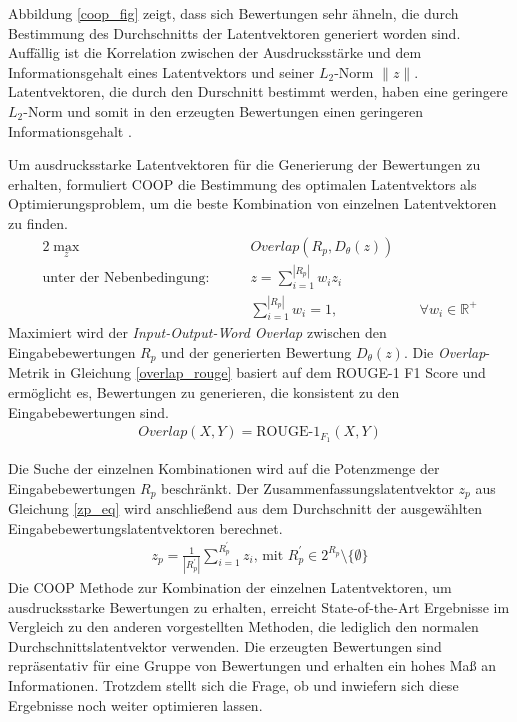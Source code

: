 Abbildung \ref{coop_fig} zeigt, dass sich Bewertungen sehr ähneln, die durch Bestimmung des Durchschnitts der Latentvektoren generiert worden sind. 
Auffällig ist die Korrelation zwischen der Ausdrucksstärke und dem Informationsgehalt eines Latentvektors und seiner $L_2$-Norm $\| z \|$.
Latentvektoren, die durch den Durschnitt bestimmt werden, haben eine geringere $L_2$-Norm und somit in den erzeugten Bewertungen einen geringeren Informationsgehalt \citep{coop}.

Um ausdrucksstarke Latentvektoren für die Generierung der Bewertungen zu erhalten, formuliert COOP \citep{coop} die Bestimmung des optimalen Latentvektors als Optimierungsproblem, um die beste Kombination von einzelnen Latentvektoren zu finden.
\begin{alignat*}{2}
    \max_z              &\quad&  Overlap(R_p, D_\theta(z))    & \\
    \text{unter der Nebenbedingung: } &\quad&  z = \sum_{i=1}^{|R_p|} w_i z_i \\
                         &\quad&  \sum_{i=1}^{|R_p|}w_i=1,                        &\quad \forall w_i \in \mathbb{R}^+
\end{alignat*}
Maximiert wird der \textit{Input-Output-Word Overlap} zwischen den Eingabebewertungen $R_p$ und der generierten Bewertung $D_\theta(z)$. 
Die \textit{Overlap}-Metrik in Gleichung \ref{overlap_rouge} basiert auf dem ROUGE-1 F1 Score und ermöglicht es, Bewertungen zu generieren, die konsistent zu den Eingabebewertungen sind.
\begin{align}
    \label{overlap_rouge}
    Overlap(X,Y) = \text{ROUGE-1}_{F_1}(X,Y)
\end{align}

Die Suche der einzelnen Kombinationen wird auf die Potenzmenge der Eingabebewertungen $R_p$ beschränkt. 
Der Zusammenfassungslatentvektor $z_p$ aus Gleichung \ref{zp_eq} wird anschließend aus dem Durchschnitt der ausgewählten Eingabebewertungslatentvektoren berechnet.
\begin{align}
z_p = \frac{1}{|R_p^{'}|} \sum_{i=1}^{R_p^{'}}z_i \text{, mit } R_p^{'} \in 2^{R_p} \setminus  \{ \emptyset\} \label{zp_eq}
\end{align}
Die COOP Methode zur Kombination der einzelnen Latentvektoren, um ausdrucksstarke Bewertungen zu erhalten, erreicht State-of-the-Art Ergebnisse im Vergleich zu den anderen vorgestellten Methoden, die lediglich den normalen Durchschnittslatentvektor verwenden.
Die erzeugten Bewertungen sind repräsentativ für eine Gruppe von Bewertungen und erhalten ein hohes Maß an Informationen. 
Trotzdem stellt sich die Frage, ob und inwiefern sich diese Ergebnisse noch weiter optimieren lassen.

